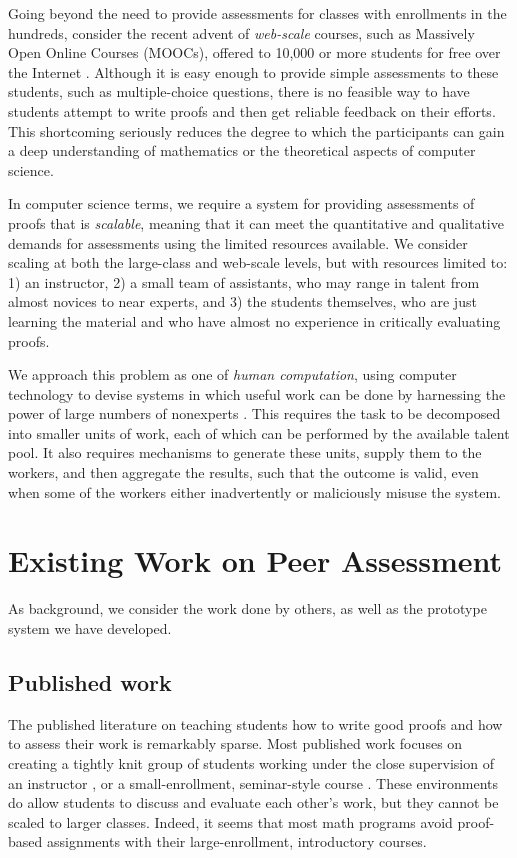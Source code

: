 \documentclass[12pt]{article}
\begin{document}
Going beyond the need to provide assessments for classes with
enrollments in the hundreds, consider the recent advent of {\em web-scale}
courses, such as Massively Open Online Courses (MOOCs),
 offered to 10,000 or more students for free over the Internet
\citep{carson-am12,lewin-nyt12}.
Although it is easy enough to provide simple
assessments to these students, such as multiple-choice questions, 
there is no feasible way to have students attempt to write proofs and
then get reliable feedback on their efforts.  This shortcoming
seriously reduces the degree to which the participants can gain a deep
understanding of mathematics or the theoretical aspects of computer science.

In computer science terms, we require a system for providing
assessments of proofs that is {\em scalable}, meaning that it can meet
the quantitative and qualitative demands for assessments using the
limited resources available.  We consider scaling at both the
large-class and web-scale levels, but with 
resources limited to: 1) an instructor, 2) a small team of assistants,
who may range in talent from almost novices to near experts, and 3) the
students themselves, who are just learning the material and who have
almost no experience in critically evaluating proofs.

We approach this problem as one of {\em human computation}, using
computer technology to devise systems in which useful work can be done by
harnessing the power of large numbers of nonexperts
\citep{quinn-chi11, vonahn05}.  This requires
the task to be decomposed into smaller units of work, each of which 
can be performed by the available talent pool.  It also requires
mechanisms to generate these units, supply them to the workers, and
then aggregate the results, such that the outcome is valid, even when
some of the workers either inadvertently or maliciously misuse the system.

\section{Existing Work on Peer Assessment}

As background, we consider the work done by others, as well as the
prototype system we have developed.

\subsection{Published work}

The published literature on teaching students how to write good proofs
and how to assess their work is remarkably sparse.  Most published
work focuses on creating a tightly knit group of students working
under the close supervision of an instructor
\citep{cohen-amm82,jones-amm77}, or a small-enrollment, seminar-style
course \citep{reisel-amm82}.  These environments do allow students to
discuss and evaluate each other's work, but they cannot be scaled to
larger classes.  Indeed, it seems that most math programs avoid
proof-based assignments with their large-enrollment, introductory
courses.
\end{document}
